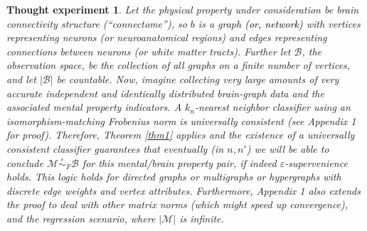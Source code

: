 \documentclass{article}
\newcommand{\mB}{\mathcal{B}}
\newcommand{\mM}{\mathcal{M}}
\newcommand{\MeB}{\mM \overset{\varepsilon}{{\sim}}_F \mB}
\providecommand{\tr}[1]{\textcolor{black}{#1}}
\newtheorem{thex}{Thought experiment}
\begin{document}
% 


\begin{thex}
Let the physical property under consideration be brain connectivity structure (``connectome''), so $b$ is a graph \tr{(or, network)} with vertices representing neurons (or neuroanatomical regions) and edges representing connections between neurons (or white matter tracts). Further let $\mB$, the observation space, be the collection of all graphs on a finite number of vertices, and let $|\mB|$ be countable. Now, imagine collecting very large amounts of very accurate independent and identically distributed brain-graph data and the associated mental property indicators. A $k_n$-nearest neighbor classifier using an isomorphism-matching Frobenius norm is universally consistent (see Appendix 1 for proof). Therefore, Theorem \ref{thm1} applies and the existence of a universally consistent classifier guarantees that eventually (in $n,n'$) we will be able to conclude $\MeB$ for this mental/brain property pair, if indeed $\varepsilon$-supervenience holds. This logic holds for directed graphs or multigraphs or hypergraphs with discrete edge weights and vertex attributes. Furthermore, Appendix 1 also extends the proof to deal with other matrix norms (which might speed up convergence), and the regression scenario, where $|\mM|$ is infinite.  
\end{thex}
\end{document}
